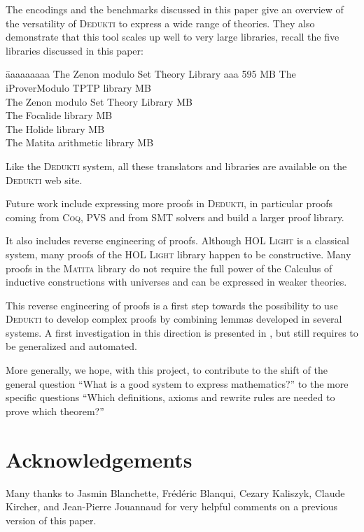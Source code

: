 \documentclass[english]{lipics}
\begin{document}
The encodings and the benchmarks discussed in this paper give an
overview of the versatility of \textsc{Dedukti} to express a wide
range of theories. They also demonstrate that this tool scales up well
to very large libraries, recall the five libraries discussed in this paper:
\begin{tabbing}
\= aaaaaaaaa \= The Zenon modulo Set Theory Library aaa \= 595 MB\kill
\> \> The iProverModulo TPTP library  MB\\
\> \> The Zenon modulo Set Theory Library  MB\\
\> \> The Focalide library  MB\\
\> \> The Holide library  MB\\
\> \> The Matita arithmetic library  MB
\end{tabbing}
Like the \textsc{Dedukti} system, all these translators and libraries
are available on the \textsc{Dedukti} web site.

Future work include expressing more proofs in \textsc{Dedukti}, in
particular proofs coming from \textsc{Coq}, \textsc{PVS} and from SMT
solvers and build a larger proof library.

It also includes reverse engineering of proofs. Although
\textsc{HOL Light} is a classical system, many proofs of the
\textsc{HOL Light} library happen to be constructive.  Many proofs
in the \textsc{Matita} library do not require the full power of the
Calculus of inductive constructions with universes and can be
expressed in weaker theories.

This reverse engineering of proofs is a first step towards the
possibility to use \textsc{Dedukti} to develop complex proofs by
combining lemmas developed in several systems.  A first investigation
in this direction is presented in \cite{AssafCauderlier2015},
but still requires to be generalized and automated.

More generally, we hope, with this project, to contribute to the shift
of the general question ``What is a good system to express
mathematics?''  to the more specific questions ``Which definitions,
axioms and rewrite rules are needed to prove which theorem?''

\section*{Acknowledgements}

Many thanks to
Jasmin Blanchette,
Fr\'ed\'eric Blanqui,
Cezary Kaliszyk,
Claude Kircher, and Jean-Pierre Jouannaud for very helpful comments on
a previous version of this paper.




\end{document}
